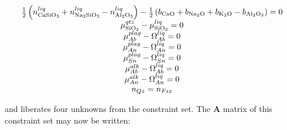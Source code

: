 \documentclass[11pt, titlepage, twoside]{article}
\begin{document}
\begin{MPEquation}[!ht]
\begin{equation}
\begin{array}{c}
\frac{1}{2}\left( {n_{{\rm{CaSi}}{{\rm{O}}_3}}^{liq} + n_{{\rm{N}}{{\rm{a}}_2}{\rm{Si}}{{\rm{O}}_3}}^{liq} - n_{{\rm{A}}{{\rm{l}}_2}{{\rm{O}}_3}}^{liq}} \right) - \frac{1}{2}\left( {{b_{{\rm{CaO}}}} + {b_{{\rm{N}}{{\rm{a}}_2}{\rm{O}}}} + {b_{{{\rm{K}}_2}{\rm{O}}}} - {b_{{\rm{A}}{{\rm{l}}_2}{{\rm{O}}_3}}}} \right) = 0\\
\mu _{{\rm{Si}}{{\rm{O}}_2}}^{qtz} - \mu _{{\rm{Si}}{{\rm{O}}_2}}^{liq} = 0\\
\mu _{Ab}^{plag} - {\Omega _{Ab}^{liq}} = 0\\
\mu _{An}^{plag} - {\Omega _{An}^{liq}} = 0\\
\mu _{Sn}^{plag} - {\Omega _{Sn}^{liq}} = 0\\
\mu _{Ab}^{alk} - {\Omega _{Ab}^{liq}} = 0\\
\mu _{An}^{alk} - {\Omega _{An}^{liq}} = 0\\
{n_{Qz}} = {n_{Fix}}
\end{array}
\end{equation}
\label{MPEquationElement:8F3D1EAD-2C88-40A6-CFE9-1FE6CE92CD1D}
\end{MPEquation}
and liberates four unknowns from the constraint set. The \textbf{A} matrix of this constraint set may now be written:
\end{document}

